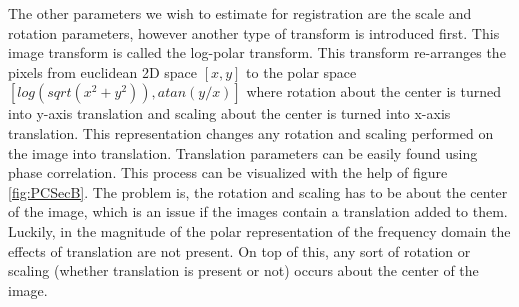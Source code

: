 The other parameters we wish to estimate for registration are the scale and rotation parameters, however another type of transform is introduced first. This image transform is called the log-polar transform. This transform re-arranges the pixels from euclidean 2D space $[x,y]$ to the polar space $[log(sqrt(x^2+y^2)),atan(y/x)]$ where rotation about the center is turned into y-axis translation and scaling about the center is turned into x-axis translation. This representation changes any rotation and scaling performed on the image into translation. Translation parameters can be easily found using phase correlation. This process can be visualized with the help of figure \ref{fig:PCSecB}. The problem is, the rotation and scaling has to be about the center of the image, which is an issue if the images contain a translation added to them. Luckily, in the magnitude of the polar representation of the frequency domain the effects of translation are not present. On top of this, any sort of rotation or scaling (whether translation is present or not) occurs about the center of the image. \\

